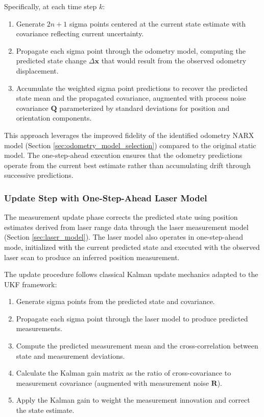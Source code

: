 \documentclass[conference]{IEEEtran}
\begin{document}
Specifically, at each time step $k$:
\begin{enumerate}
    \item Generate $2n + 1$ sigma points centered at the current state estimate with covariance reflecting current uncertainty.
    \item Propagate each sigma point through the odometry model, computing the predicted state change $\Delta \mathbf{x}$ that would result from the observed odometry displacement.
    \item Accumulate the weighted sigma point predictions to recover the predicted state mean and the propagated covariance, augmented with process noise covariance $\mathbf{Q}$ parameterized by standard deviations for position and orientation components.
\end{enumerate}

This approach leverages the improved fidelity of the identified odometry NARX model (Section \ref{sec:odometry_model_selection}) compared to the original static model. The one-step-ahead execution ensures that the odometry predictions operate from the current best estimate rather than accumulating drift through successive predictions.

\subsubsection{Update Step with One-Step-Ahead Laser Model}

The measurement update phase corrects the predicted state using position estimates derived from laser range data through the laser measurement model (Section \ref{sec:laser_model}). The laser model also operates in one-step-ahead mode, initialized with the current predicted state and executed with the observed laser scan to produce an inferred position measurement.

The update procedure follows classical Kalman update mechanics adapted to the UKF framework:
\begin{enumerate}
    \item Generate sigma points from the predicted state and covariance.
    \item Propagate each sigma point through the laser model to produce predicted measurements.
    \item Compute the predicted measurement mean and the cross-correlation between state and measurement deviations.
    \item Calculate the Kalman gain matrix as the ratio of cross-covariance to measurement covariance (augmented with measurement noise $\mathbf{R}$).
    \item Apply the Kalman gain to weight the measurement innovation and correct the state estimate.
\end{enumerate}
\end{document}
